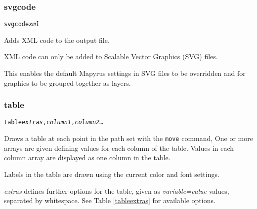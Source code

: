\subsubsection{svgcode}

\begin{alltt}
svgcode \textit{xml}
\end{alltt}

Adds XML code to the output file.

XML code can only be added to Scalable Vector Graphics (SVG) files.

This enables the default Mapyrus settings in SVG files to
be overridden and for graphics to be grouped together as layers.

\subsubsection{table}

\begin{alltt}
table \textit{extras}, \textit{column1}, \textit{column2} \dots
\end{alltt}

Draws a table at each point in the path set with the \texttt{move} command,
One or more arrays are given defining values for each column of the table.
Values in each column array are displayed as one column in the table.

Labels in the table are drawn using the current color and font settings.

\textit{extras} defines further options for the table, given as
\textit{variable=value} values, separated by whitespace.
See Table \ref{tableextras}
for available options.

